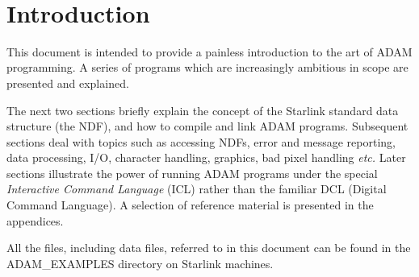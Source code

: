\stardocabstract
 \newpage
 \begin{latexonly}
   \setlength{\parskip}{0mm}
   \latexonlytoc
   \setlength{\parskip}{\medskipamount}
   \markright{\stardocname}
 \end{latexonly}
\newpage
~
\newpage

\renewcommand{\thepage}{\arabic{page}}
\setcounter{page}{1}

\section{Introduction\label{intro}}

This document is intended to provide a painless introduction to  the art
of ADAM programming.
A series of programs which are increasingly ambitious  in scope are 
presented and  explained.

The next  two sections briefly explain the 
concept of the Starlink standard data structure (the NDF), and
how to compile and link ADAM programs.
Subsequent sections deal with 
topics such as accessing  NDFs, error and message reporting, data processing,
I/O, character handling, graphics, 
bad pixel handling {\it etc.}
Later sections illustrate the power of running ADAM programs under the 
special {\sl Interactive Command Language} (ICL) rather than the familiar
DCL (Digital Command Language).
A selection of reference material is presented in the appendices.

All the files, including data files, referred to in this document can be 
found in the ADAM\_EXAMPLES directory on Starlink machines.

